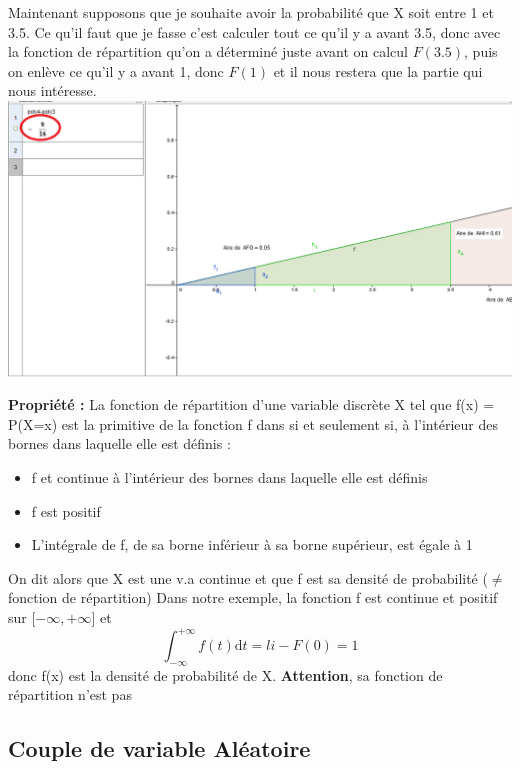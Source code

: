 \documentclass[a4paper]{article}
\begin{document}
\newline
Maintenant supposons que je souhaite avoir la probabilité que X soit entre 1 et 3.5. Ce qu'il faut que je fasse c'est calculer tout ce qu'il y a avant 3.5, donc avec la fonction de répartition qu'on a déterminé juste avant on calcul $F(3.5)$, puis on enlève ce qu'il y a avant 1, donc $F(1)$ et il nous restera que la partie qui nous intéresse. \newline
\includegraphics[scale=0.6]{Graph4.png}
\newline

\textbf{Propriété :} La fonction de répartition d'une variable discrète X tel que f(x) = P(X=x) est la primitive de la fonction f dans si et seulement si, à l'intérieur des bornes dans laquelle elle est définis :
\begin{itemize}
\item f et continue à l'intérieur des bornes dans laquelle elle est définis
\item f est positif 
\item L'intégrale de f, de sa borne inférieur à sa borne supérieur, est égale à 1
\end{itemize} 
On dit alors que X est une v.a continue et que f est sa densité de probabilité ($\neq$ fonction de répartition)
Dans notre exemple, la fonction f est continue et positif sur [$-\infty , +\infty$] et 
$$ \int_{-\infty}^{+\infty} f(t)\text{d}t = li - F(0) = 1 $$
donc f(x) est la densité de probabilité de X. \textbf{Attention}, sa fonction de répartition n'est pas 

\subsection{Couple de variable Aléatoire}
\end{document}
